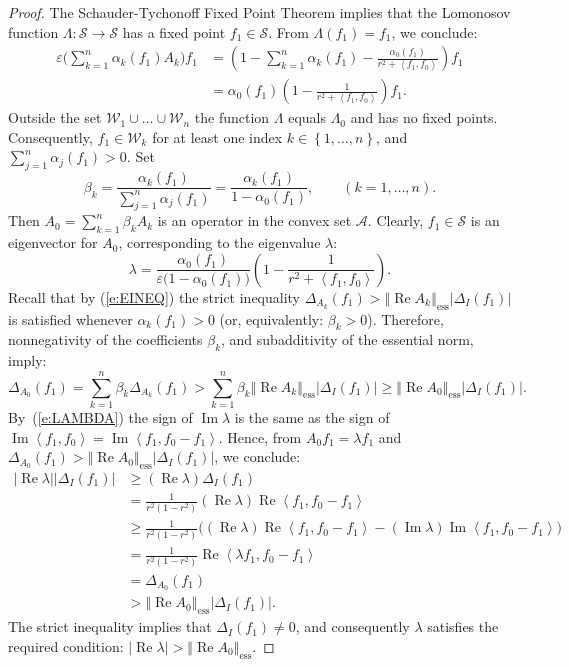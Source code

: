 \documentclass{tran-l}
\theoremstyle{definition}
\theoremstyle{remark}
\numberwithin{equation}{subsection}
\DeclareMathOperator{\RE}{Re}
\DeclareMathOperator{\IM}{Im}
\DeclareMathOperator{\ess}{ess}
\newcommand{\eps}{\varepsilon}
\newcommand{\To}{\longrightarrow}
\newcommand{\s}{\mathcal{S}}
\newcommand{\A}{\mathcal{A}}
\newcommand{\W}{\mathcal{W}}
\newcommand{\abs}[1]{\left\vert#1\right\vert}
\newcommand{\set}[1]{\left\{#1\right\}}
\newcommand{\seq}[1]{\left<#1\right>}
\newcommand{\norm}[1]{\left\Vert#1\right\Vert}
\newcommand{\essnorm}[1]{\norm{#1}_{\ess}}
\begin{document}
\begin{proof}
The Schauder-Tychonoff Fixed Point Theorem implies that the Lomonosov function $\Lambda\colon\s\To\s$ has a fixed point $f_1\in\s$. From $\Lambda(f_1)=f_1$, we conclude:
\begin{align*}
  \eps \Big(\sum_{k=1}^n \alpha_k(f_1) A_k\Big)f_1 & =
  \left(1 - \sum_{k=1}^n \alpha_k(f_1)
    - \frac{\alpha_0(f_1)}{r^2+\seq{f_1,f_0}} \right)f_1\\
  & = \alpha_0(f_1)\left(1 - \frac{1}{r^2+\seq{f_1,f_0}}\right)f_1.
\end{align*}
Outside the set $\W_1\cup\ldots\cup\W_n$ the function $\Lambda$ equals $\Lambda_0$ and has no fixed points. Consequently, $f_1\in\W_k$ for at least one index $k\in\set{1,\ldots,n}$, and $\sum_{j=1}^n\alpha_j(f_1)>0$. Set
\[ \beta_k=\frac{\alpha_k(f_1)}{\sum_{j=1}^n \alpha_j(f_1)}=
  \frac{\alpha_k(f_1)}{1-\alpha_0(f_1)}, \qquad (k=1,\ldots,n). \]
Then $A_0=\sum_{k=1}^n \beta_k A_k$ is an operator in the convex set $\A$. Clearly, $f_1\in\s$ is an eigenvector for $A_0$, corresponding to the eigenvalue $\lambda$:
\begin{equation}\label{e:LAMBDA}
  \lambda = \frac{\alpha_0(f_1)}{\eps\big(1-\alpha_0(f_1)\big)}
  \left(1 - \frac{1}{r^2+\seq{f_1,f_0}}\right).
\end{equation}
Recall that by (\ref{e:EINEQ}) the strict inequality $\Delta_{A_k}(f_1) > \essnorm{\RE{A_k}}\abs{\Delta_I(f_1)}$ is satisfied whenever $\alpha_k(f_1)>0$ (or, equivalently: $\beta_k>0$). Therefore, nonnegativity of the coefficients $\beta_k$, and subadditivity of the essential norm, imply:
\[ \Delta_{A_0}(f_1) =
  \sum_{k=1}^n \beta_k \Delta_{A_k}(f_1)
  > \sum_{k=1}^n \beta_k \essnorm{\RE{A_k}}\abs{\Delta_I(f_1)}
  \geq \essnorm{\RE{A_0}}\abs{\Delta_I(f_1)}. \]
By~(\ref{e:LAMBDA}) the sign of $\IM\lambda$ is the same as the sign of $\IM\seq{f_1,f_0}=\IM\seq{f_1,f_0-f_1}$. Hence, from $A_0f_1=\lambda{f_1}$ and $\Delta_{A_0}(f_1)>\essnorm{\RE{A_0}}\abs{\Delta_I(f_1)}$, we conclude:
\begin{align*}
  \abs{\RE\lambda}\abs{\Delta_I(f_1)} &\geq
  (\RE\lambda)\Delta_I(f_1) \\ & = \tfrac{1}{r^2(1-r^2)}(\RE\lambda)
  \RE\seq{f_1, f_0-f_1} \\ &\geq
  \tfrac{1}{r^2(1-r^2)}\big((\RE\lambda)\RE\seq{f_1, f_0-f_1}-
    (\IM\lambda)\IM\seq{f_1, f_0-f_1}\big)\\ & =
  \tfrac{1}{r^2(1-r^2)}\RE\seq{\lambda f_1, f_0-f_1} \\ & =
  \Delta_{A_0}(f_1) \\ & > \essnorm{\RE{A_0}}\abs{\Delta_I(f_1)}.
\end{align*}
The strict inequality implies that $\Delta_I(f_1)\neq0$, and consequently $\lambda$ satisfies the required condition: $\abs{\RE\lambda}>\essnorm{\RE{A_0}}$.
\end{proof}
\end{document}
